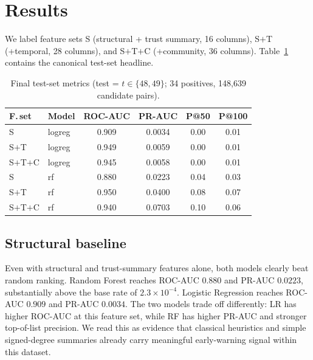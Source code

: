 \documentclass[conference]{IEEEtran}
\begin{document}
\section{Results}\label{sec:results}

We label feature sets S (structural + trust summary, 16 columns),
S$+$T (+temporal, 28 columns), and S$+$T$+$C (+community, 36 columns).
Table~\ref{tab:test_metrics} contains the canonical test-set headline.

\begin{table}[t]
\caption{Final test-set metrics (test = $t \in \{48, 49\}$;
34 positives, 148{,}639 candidate pairs).}
\label{tab:test_metrics}
\centering
\begin{tabular}{llcccc}
\toprule
F.\,set & Model & ROC-AUC & PR-AUC & P@50 & P@100 \\
\midrule
S      & logreg & 0.909 & 0.0034 & 0.00 & 0.01 \\
S$+$T   & logreg & 0.949 & 0.0059 & 0.00 & 0.01 \\
S$+$T$+$C & logreg & 0.945 & 0.0058 & 0.00 & 0.01 \\
\addlinespace
S      & rf     & 0.880 & 0.0223 & 0.04 & 0.03 \\
S$+$T   & rf     & 0.950 & 0.0400 & 0.08 & 0.07 \\
S$+$T$+$C & rf     & 0.940 & 0.0703 & 0.10 & 0.06 \\
\bottomrule
\end{tabular}
\end{table}

\subsection{Structural baseline}
Even with structural and trust-summary features alone, both models
clearly beat random ranking. Random Forest reaches ROC-AUC $0.880$ and
PR-AUC $0.0223$, substantially above the base rate of
$2.3 \times 10^{-4}$. Logistic Regression reaches ROC-AUC $0.909$ and
PR-AUC $0.0034$. The two models trade off differently: LR has higher
ROC-AUC at this feature set, while RF has higher PR-AUC and stronger
top-of-list precision. We read this as evidence that classical
heuristics and simple signed-degree summaries already carry
meaningful early-warning signal within this dataset.
\end{document}
